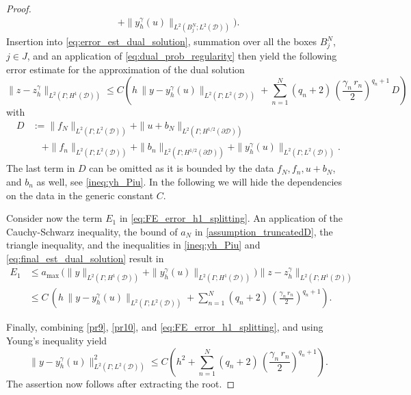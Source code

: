 \documentclass[10pt,a4paper]{amsart}
\newcommand{\cD}{{\mathcal{D}}}
\newcommand{\yH}{{L^2(\Gamma;H^1(\cD))}}
\begin{document}
\begin{proof}
\begin{align*}
    + \|y_h^\gamma(u)\|_{L^2(B_j^N; L^2(\cD))}\Big).
  \end{align*}
  Insertion into \eqref{eq:error_est_dual_solution}, summation over all the boxes $B_j^N$, $j\in J$, and an application of \eqref{eq:dual_prob_regularity} then yield the following error estimate for the approximation of the dual solution
  \begin{equation}\label{eq:final_est_dual_solution}
    \|z-z_h^\gamma\|_{L^2(\Gamma; H^1(\cD))}
    \le C\left(h\,\|y-y_h^\gamma(u)\|_{L^2(\Gamma; L^2(\cD))}
    + \sum_{n=1}^N (q_n+2)\,\left(\frac{\gamma_n\,r_n}{2}\right)^{q_n+1}\,D\right)
  \end{equation}
  with
  \begin{align*}
    D&:= \|f_N\|_{L^2(\Gamma; L^2(\cD))} + \|u + b_N\|_{L^2(\Gamma;H^{1/2}(\partial\cD))} \\
    &\quad+ \|f_n\|_{L^2(\Gamma; L^2(\cD))} + \|b_n\|_{L^2(\Gamma; H^{1/2}(\partial\cD))}
    + \|y_h^\gamma(u)\|_{L^2(\Gamma; L^2(\cD))}.
  \end{align*}
  The last term in $D$ can be omitted as it is bounded by the data $f_N, f_n, u+b_N$, and $b_n$ as well, see \eqref{ineq:yh_Piu}. In the following we will hide the dependencies on the data in the generic constant $C$.

  Consider now the term $E_1$ in \eqref{eq:FE_error_h1_splitting}.
  An application of  the Cauchy-Schwarz inequality, the bound of $a_N$ in \eqref{assumption_truncatedD},  the triangle inequality, and the inequalities in \eqref{ineq:yh_Piu} and \eqref{eq:final_est_dual_solution} result in 
\begin{align}
\label{pr10}
  E_1
  & \leq  a_{\max} \, \big( \|y\|_{\yH} + \|y_h^{\gamma}(u)\|_{\yH} \big)   \|z - z_h^\gamma\|_{L^2(\Gamma; H^1(\cD))}  \nonumber \\ 
  & \leq   C\,\left(h\,\|y-y_h^\gamma(u)\|_{L^2(\Gamma; L^2(\cD))}
    + \sum_{n=1}^N (q_n+2)\,\left(\frac{\gamma_n\,r_n}{2}\right)^{q_n+1}\right).
\end{align}

Finally, combining \eqref{pr9}, \eqref{pr10}, and \eqref{eq:FE_error_h1_splitting}, and using Young's inequality yield
\begin{equation*}
  \|y-y_h^\gamma(u)\|_{L^2(\Gamma; L^2(\cD))}^2 \le C\left(h^2 
  + \sum_{n=1}^N(q_n+2)\,\left(\frac{\gamma_n\,r_n}{2}\right)^{q_n+1}\right).
\end{equation*}
The assertion now follows after extracting the root.
\end{proof}
\end{document}
